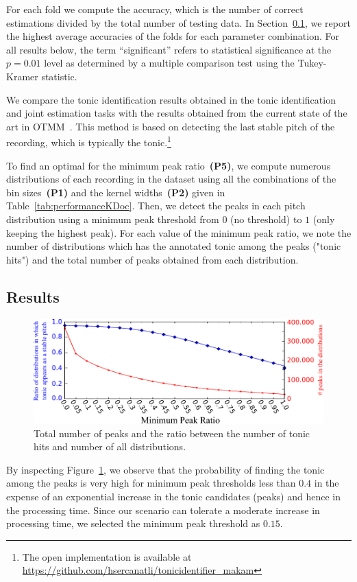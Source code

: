 \documentclass{sig-alternate}
\begin{document}
For each fold we compute the accuracy, which is the number of correct estimations divided by the total number of testing data. In Section~\ref{sec:results}, we
report the highest average accuracies of the folds for each parameter combination. For all results below, the term ``significant'' refers to statistical significance at the $p = 0.01$ level as determined by a multiple comparison test using the Tukey-Kramer statistic.

We compare the tonic identification results obtained in the tonic identification and joint estimation tasks with the results obtained from the current state of the art in OTMM~\cite{sercan_tonic}. This method is based on detecting the last stable pitch of the recording, which is typically the tonic.\footnote{The open implementation is available at \url{https://github.com/hsercanatli/tonicidentifier_makam}}

To find an optimal for the minimum peak ratio~\textbf{(P5)}, we compute numerous distributions of each recording in the dataset using all the combinations of the bin sizes~\textbf{(P1)} and the kernel widths~\textbf{(P2)} given in Table~\ref{tab:performanceKDoc}. Then, we detect the peaks in each pitch distribution using a minimum peak threshold from $0$ (no threshold) to $1$ (only keeping the highest peak). For each value of the minimum peak ratio, we note the number of distributions which has the annotated tonic among the peaks ("tonic hits") and the total number of peaks obtained from each distribution. 

\subsection{Results}\label{sec:results}

\begin{figure}
\centering
\includegraphics[width=.8\columnwidth]{figures/min_peak_ratio}
\caption{Total number of peaks and the ratio between the number of tonic hits and number of all distributions.}
\label{fig:min_peak_ratio}
\end{figure}

By inspecting Figure~\ref{fig:min_peak_ratio}, we observe that the probability of finding the tonic among the peaks is very high for minimum peak thresholds less than $0.4$ in the expense of an exponential increase in the tonic candidates (peaks) and hence in the processing time. Since our scenario can tolerate a moderate increase in processing time, we selected the minimum peak threshold as $0.15$.
\end{document}
